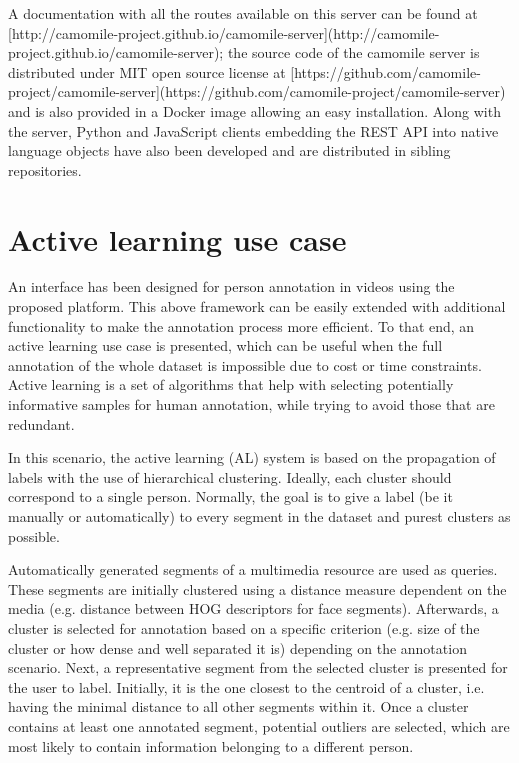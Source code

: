 \documentclass[10pt, a4paper]{article}
\begin{document}
A documentation with all the routes available on this server can be found at 
[http://camomile-project.github.io/camomile-server](http://camomile-project.github.io/camomile-server); the source code of the camomile server is distributed under MIT open source license at
[https://github.com/camomile-project/camomile-server](https://github.com/camomile-project/camomile-server) and is also provided in a Docker image allowing an easy installation.
Along with the server, Python and JavaScript clients embedding the REST API into native language objects have also been developed and are distributed in sibling repositories.


\section{Active learning use case}

An interface has been designed for person annotation in videos using the proposed platform. This above framework can be easily extended with additional functionality to make the annotation process more efficient. To that end, an active learning use case is presented, which can be useful when the full annotation of the whole dataset is impossible due to cost or time constraints. Active learning is a set of algorithms that help with selecting  potentially informative samples for human annotation, while trying to avoid those that are redundant.

In this scenario, the active learning (AL) system is based on the propagation of labels with the use of hierarchical clustering. Ideally, each cluster should correspond to a single person. Normally, the goal is to give a label (be it manually or automatically) to every segment in the dataset and purest clusters as possible.

Automatically generated segments of a multimedia resource are used as queries. These segments are initially clustered using a distance measure dependent on the media (e.g. distance between HOG descriptors for face segments).  Afterwards, a cluster is selected for annotation based on a specific criterion (e.g. size of the cluster or how dense and well separated it is) depending on the annotation scenario. Next, a representative segment from the selected cluster is presented for the user to label. Initially, it is the one closest to the centroid of a cluster, i.e. having the minimal distance to all other segments within it. Once a cluster contains at least one annotated segment, potential outliers are selected, which are most likely to contain information belonging to a different person.
\end{document}
